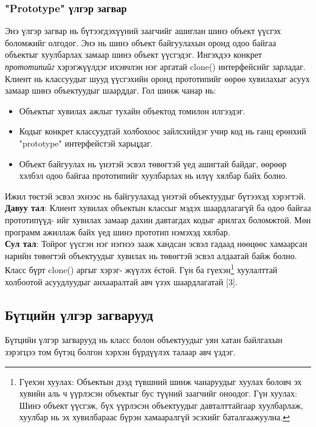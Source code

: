 \subsubsection{"Prototype" үлгэр загвар}
\quad \quad Энэ үлгэр загвар нь бүтээгдэхүүний заагчийг ашиглан шинэ объект үүсгэх боломжийг олгодог. Энэ нь шинэ объект байгуулахын оронд одоо байгаа объектыг хуулбарлах замаар шинэ объект үүсгэдэг. Ингэхдээ конкрет \textit{прототипийг} хэрэгжүүлдэг ихэвчлэн нэг аргатай clone() интерфейсийг зарладаг. Клиент нь классуудыг шууд үүсгэхийн оронд прототипийг өөрөө хувилахыг асуух замаар шинэ объектуудыг шаарддаг. Гол шинж чанар нь:
\begin{itemize}
	\item Объектыг хувилах ажлыг тухайн объектод томилон илгээдэг.
	\item Кодыг конкрет классуудтай холбохоос зайлсхийдэг учир код нь ганц ерөнхий "prototype" интерфейстэй харьцдаг.
	\item Объект байгуулах нь үнэтэй эсвэл төвөгтэй үед ашигтай байдаг, өөрөөр хэлбэл одоо байгаа прототипийг хуулбарлах нь илүү хялбар байх болно.
\end{itemize}
Ижил төстэй эсвэл эхнээс нь байгуулахад үнэтэй объектуудыг бүтээхэд хэрэгтэй.\\
\textbf{Давуу тал}: Клиент хувилах объектын классыг мэдэх шаардлагагүй ба одоо байгаа прототипүүд- ийг хувилах замаар дахин давтагдах кодыг арилгах боломжтой. Мөн программ ажиллаж байх үед шинэ прототип нэмэхэд хялбар.\\
\textbf{Сул тал}: Тойрог үүсгэн нэг нэгнээ зааж хандсан эсвэл гадаад нөөцөөс хамаарсан нарийн төвөгтэй объектуудыг хувилах нь төвөгтэй эсвэл алдаатай байж болно. Класс бүрт  clone()  аргыг хэрэг- жүүлэх ёстой. Гүн ба гүехэн\footnote{
	Гүехэн хуулах: Объектын дээд түвшний шинж чанаруудыг хуулах боловч эх хувийн аль ч үүрлэсэн объектыг бус түүний заагчийг оноодог.
	Гүн хуулах: Шинэ объект үүсгэж, бүх үүрлэсэн объектуудыг давталттайгаар хуулбарлаж, хуулбар нь эх хувилбараас бүрэн хамааралгүй эсэхийг баталгаажуулна.
} хуулалттай холбоотой асуудлуудыг анхааралтай авч үзэх шаардлагатай [3].

\subsection{Бүтцийн үлгэр загварууд}
Бүтцийн үлгэр загварууд нь класс болон объектуудыг уян хатан байлгахын зэрэгцээ том бүтэц болгон хэрхэн бүрдүүлэх талаар авч үздэг.




